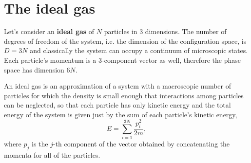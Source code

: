 \documentclass[12pt]{article}
\numberwithin{equation}{section} %
\begin{document}
\tableofcontents


\section{The ideal gas}
Let's consider an \textbf{ideal gas} of $N$ particles in $3$ dimensions. The number of degrees of freedom of the system, i.e. the dimension of the configuration space, is $D=3N$ and classically the system can occupy a continuum of microscopic states. Each particle's momentum is a $3$-component vector as well, therefore the phase space has dimension $6N$.

An ideal gas is an approximation of a system with a macroscopic number of particles for which the density is small enough that interactions among particles can be neglected, so that each particle has only kinetic energy and the total energy of the system is given just by the sum of each particle's kinetic energy,
\begin{equation}
E = \sum_{i=1}^{3N} \frac {p_i^2}{2 m},
\end{equation}
where $p_j$ is the $j$-th component of the vector obtained by concatenating the momenta for all of the particles.
\end{document}
